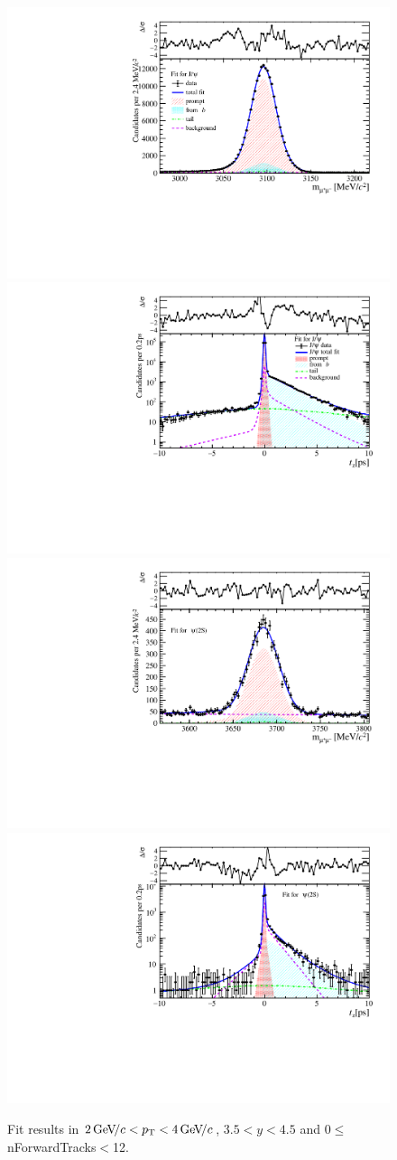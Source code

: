 \begin{figure}[H]
\begin{center}
\includegraphics[width=0.47\linewidth]{pdf/Jpsi/drawmassF/n1y3pt2.pdf}
\includegraphics[width=0.47\linewidth]{pdf/Jpsi/2DFitF/n1y3pt2.pdf}
\vspace*{-0.5cm}
\includegraphics[width=0.47\linewidth]{pdf/Psi2S/drawmassF/n1y3pt2.pdf}
\includegraphics[width=0.47\linewidth]{pdf/Psi2S/2DFitF/n1y3pt2.pdf}
\vspace*{-0.5cm}
\end{center}
\caption{Fit results in $2\text{\,Ge\kern -0.1em V\!/}c<p_{\mathrm{T}}<4\text{\,Ge\kern -0.1em V\!/}c$, $3.5<y<4.5$ and 0$\leq$nForwardTracks$<$12.}
\label{Fitn1y3pt2}
\end{figure}
